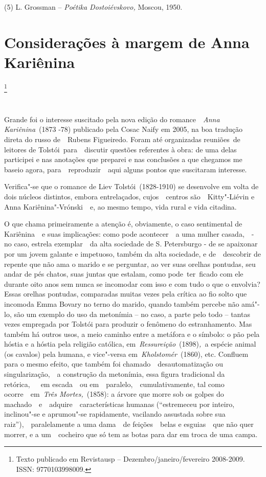 (5) L. Grossman -- \emph{Poétika Dostoiévskovo,} Moscou, 1950.

\chapter{Considerações à margem de Anna Kariênina}\footnote{Texto
  publicado em Revistausp -- Dezembro/janeiro/fevereiro 2008-2009. ISSN:
  9770103998009.}

~

Grande foi o interesse suscitado pela nova edição do romance~~\emph{Anna
Kariênina}~(1873 -78) publicado pela Cosac Naify em 2005, na boa
tradução direta do russo de~~Rubens Figueiredo. Foram até organizadas
reuniões~de leitores de Tolstói~para~~discutir questões referentes à
obra: de uma delas participei e nas anotações que preparei e nas
conclusões a que chegamos me baseio agora, para~~reproduzir~~aqui alguns
pontos que suscitaram interesse.

Verifica"-se que o romance de Liev Tolstói~(1828-1910) se desenvolve em
volta de dois núcleos distintos, embora entrelaçados, cujos~~centros
são~~Kitty"-Liévin e Anna Kariênina"-Vrónski~~e, ao mesmo tempo, vida
rural e vida citadina.

O que chama primeiramente a atenção é, obviamente, o caso sentimental de
Kariênina~~e suas implicações: como pode acontecer~~a uma mulher
casada,~~- no caso, estrela exemplar~~da alta sociedade de S.
Petersburgo - de se apaixonar por um jovem galante e impetuoso, também
da alta sociedade, e de~~descobrir de repente que não ama o marido e se
perguntar, ao ver suas orelhas pontudas, seu andar de pés chatos, suas
juntas que estalam, como pode~ter~ficado com ele durante oito anos sem
nunca se incomodar com isso e com tudo o que o envolvia? Essas orelhas
pontudas, comparadas muitas vezes pela crítica ao fio solto que incomoda
Emma Bovary no terno do marido, quando também percebe não amá"-lo, são um
exemplo do uso da metonímia -- no caso, a parte pelo todo -- tantas
vezes empregada por Tolstói para produzir o fenômeno do estranhamento.
Mas também há outros usos, a meio caminho entre a metáfora e o símbolo:
o pão pela hóstia e a hóstia pela religião católica,
em~\emph{Ressureição}~(1898)\emph{,~}a espécie animal (os cavalos) pela
humana, e vice"-versa em~\emph{Kholstomér}~(1860), etc. Confluem para o
mesmo efeito, que também foi chamado~~desautomatização ou
singularização,~~a construção da metonímia, essa figura tradicional da
retórica,~~~em escada~~ou em~~paralelo,~~cumulativamente, tal como
ocorre~~em~\emph{Três Mortes,}~(1858): a árvore que morre sob os golpes
do machado~~e~~adquire~~características humanas (``estremeceu por
inteiro, inclinou"-se e aprumou"-se rapidamente, vacilando assustada sobre
sua raiz''),~~paralelamente a uma dama~~de feições~~belas e esguias~~que
não quer morrer, e a um~~cocheiro que só tem as botas para dar em troca
de uma campa.

